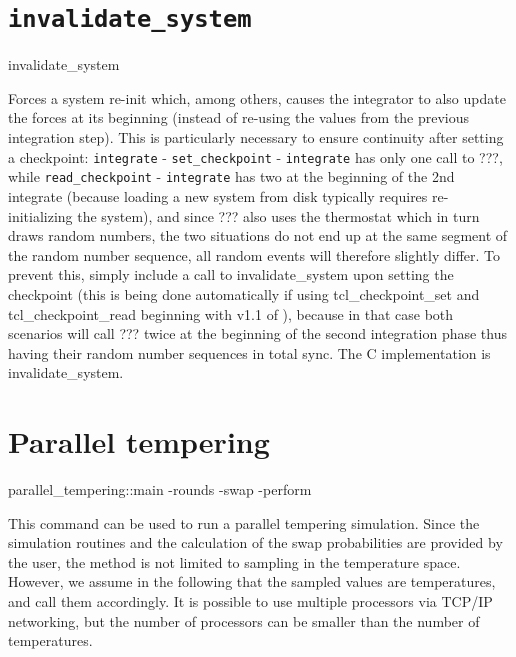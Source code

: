 \section{\texttt{invalidate_system}}
\begin{essyntax}
  invalidate_system
\end{essyntax}

Forces a system re-init which, among others, causes the integrator to
also update the forces at its beginning (instead of re-using the
values from the previous integration step).  This is particularly
necessary to ensure continuity after setting a checkpoint:
\texttt{integrate} - \texttt{set_checkpoint} - \texttt{integrate} has
only one call to ???, while \texttt{read_checkpoint} -
\texttt{integrate} has two at the beginning of the 2nd integrate
(because loading a new system from disk typically requires
re-initializing the system), and since ??? also uses the thermostat
which in turn draws random numbers, the two situations do not end up
at the same segment of the random number sequence, all random events
will therefore slightly differ.  To prevent this, simply include a
call to invalidate_system upon setting the checkpoint (this is being
done automatically if using tcl_checkpoint_set and
tcl_checkpoint_read beginning with v1.1 of \es{}), because in that
case both scenarios will call ??? twice at the beginning of the second
integration phase thus having their random number sequences in total
sync. The C implementation is invalidate_system.

\section{Parallel tempering}
\begin{essyntax}
  parallel_tempering::main
  -rounds 
  -swap 
  -perform 
\end{essyntax}

This command can be used to run a parallel tempering simulation. Since the simulation routines and
the calculation of the swap probabilities are provided by the user, the method is not limited to
sampling in the temperature space. However, we assume in the following that the sampled values are
temperatures, and call them accordingly. It is possible to use multiple processors via TCP/IP
networking, but the number of processors can be smaller than the number of temperatures.

